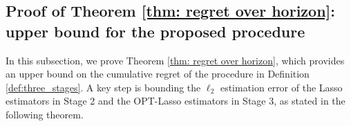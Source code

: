 \documentclass[aos,preprint]{imsart}
\theoremstyle{plain}
\theoremstyle{definition}
\begin{document}

\subsection{Proof of Theorem \ref{thm: regret over horizon}: upper bound for the proposed procedure} \label{sec: proof of thm: regret over horizon}

In this subsection, we prove Theorem \ref{thm: regret over horizon}, which provides an upper bound on the cumulative regret of the procedure in Definition \ref{def:three_stages}. A key step is bounding the $\ell_2$ estimation error of the Lasso estimators in Stage 2 and the OPT-Lasso estimators in Stage 3, as stated in the following theorem.
\end{document}
